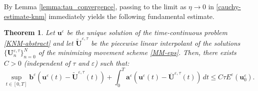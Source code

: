 \documentclass[a4paper,11pt]{article}
\newtheorem{theorem}{Theorem}[section]
\theoremstyle{definition}
\numberwithin{equation}{section}
\newcommand{\e}{\varepsilon}
\newcommand{\U}{\mathbf{U}}
\begin{document}
By Lemma \ref{lemma:tau_convergence}, passing to the limit as $\eta \to 0$ in \eqref{cauchy-estimate-knm} immediately yields the following fundamental estimate.
\begin{theorem}
	Let $\mathbf{u}^\e$ be the unique solution of the time-continuous problem \eqref{KNM-abstract} and let $\widetilde{\U}^{\e, \tau}$ be the piecewise linear interpolant of the solutions $\{\U^{\e,\tau}_n\}_{n=0}^N$ of the minimizing movement scheme \eqref{MM-eps}. Then, there exists $C > 0$ (independent of $\tau$ and $\e$) such that:
	\begin{equation}
		\label{final-error-estimate}
		\sup_{t \in [0, T]} \mathbf{b}^\e(\mathbf{u}^\e(t) - \widetilde{\mathbf{U}}^{\e, \tau}(t)) + \int_0^T \mathbf{a}^\e(\mathbf{u}^\e(t) - \overline{\mathbf{U}}^{\e, \tau}(t)) \, dt \le C \tau E^\e(\mathbf{u}_0^\e).
	\end{equation}
\end{theorem}


\end{document}
